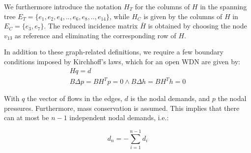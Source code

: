 We furthermore introduce the notation $H_T$ for the columns of $H$ in the spanning tree $E_T=\{e_1,e_2,e_4,..,e_6,e_8,..,e_{14}\}$, while $H_C$ is given by the columns of $H$ in $E_C=\{e_3,e_7\}$. The reduced incidence matrix $\bar{H}$ is obtained by choosing the node $ v_{13} $ as reference and eliminating the corresponding row of $H$.

In addition to these graph-related definitions, we require a few boundary conditions imposed by Kirchhoff's laws, which for an open WDN are given \cite{Jensen} by:
\begin{gather}
	Hq = d \label{eq:KirchNodeLaw} \\
	B\Delta p = B H^T p = 0 \wedge B\Delta h = B H^T h = 0 \label{eq:KirchMeshLaw}
\end{gather} 

With $q$ the vector of flows in the edges, $d$ is the nodal demands, and $p$ the nodal pressures. Furthermore, mass conservation is assumed. This implies that there can at most be $n-1$ independent nodal demands, i.e.:

\begin{equation}\label{eq:MassConservation}
	d_n = -\sum_{i=1}^{n-1}d_i
\end{equation}

